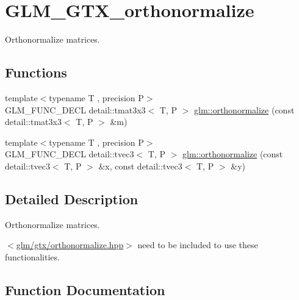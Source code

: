 \hypertarget{group__gtx__orthonormalize}{}\section{G\+L\+M\+\_\+\+G\+T\+X\+\_\+orthonormalize}
\label{group__gtx__orthonormalize}


Orthonormalize matrices.  


\subsection*{Functions}
\begin{DoxyCompactItemize}
\item 
{\footnotesize template$<$typename T , precision P$>$ }\\G\+L\+M\+\_\+\+F\+U\+N\+C\+\_\+\+D\+E\+CL detail\+::tmat3x3$<$ T, P $>$ \hyperlink{group__gtx__orthonormalize_ga2d615d8b740d7d11e583651c34103e40}{glm\+::orthonormalize} (const detail\+::tmat3x3$<$ T, P $>$ \&m)
\item 
{\footnotesize template$<$typename T , precision P$>$ }\\G\+L\+M\+\_\+\+F\+U\+N\+C\+\_\+\+D\+E\+CL detail\+::tvec3$<$ T, P $>$ \hyperlink{group__gtx__orthonormalize_ga41d176cb31fda91b672655c839084b43}{glm\+::orthonormalize} (const detail\+::tvec3$<$ T, P $>$ \&x, const detail\+::tvec3$<$ T, P $>$ \&y)
\end{DoxyCompactItemize}


\subsection{Detailed Description}
Orthonormalize matrices. 

$<$\hyperlink{orthonormalize_8hpp}{glm/gtx/orthonormalize.\+hpp}$>$ need to be included to use these functionalities. 

\subsection{Function Documentation}
